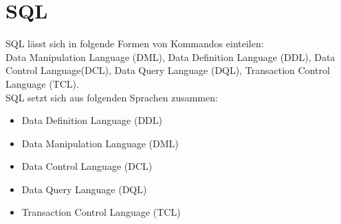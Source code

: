 \documentclass[12pt,a4paper]{article}
\begin{document}
\section{SQL}
	SQL lässt sich in folgende Formen von Kommandos einteilen: \\
	Data Manipulation Language (DML), Data Definition Language (DDL), Data Control Language(DCL), Data Query Language (DQL), Transaction Control Language (TCL).\\
	SQL setzt sich aus folgenden Sprachen zusammen:
	\begin{itemize}
		\item Data Definition Language (DDL)
		\item Data Manipulation Language (DML)
		\item Data Control Language (DCL)
		\item Data Query Language (DQL)
		\item Transaction Control Language (TCL)
	\end{itemize}
\end{document}
